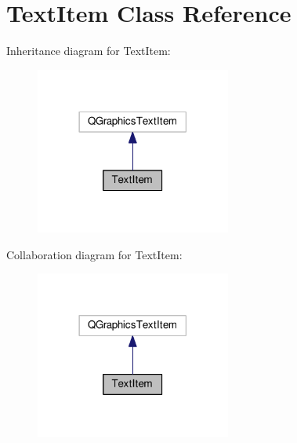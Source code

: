 \hypertarget{class_text_item}{}\section{Text\+Item Class Reference}
\label{class_text_item}


Inheritance diagram for Text\+Item\+:\nopagebreak
\begin{figure}[H]
\begin{center}
\leavevmode
\includegraphics[width=182pt]{class_text_item__inherit__graph}
\end{center}
\end{figure}


Collaboration diagram for Text\+Item\+:\nopagebreak
\begin{figure}[H]
\begin{center}
\leavevmode
\includegraphics[width=182pt]{class_text_item__coll__graph}
\end{center}
\end{figure}
